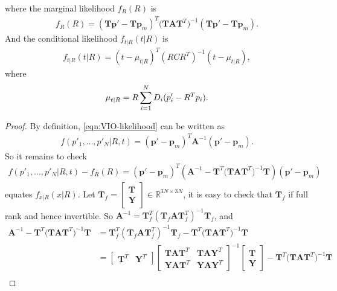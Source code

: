 \begin{theorem}
	where the marginal likelihood $f_R(R)$ is
	\begin{align} \label{eqn:VIO-likelihood-marginal}
		f_R(R) = (\mathbf{T}\bm{p}'-\mathbf{T}\bm{p}_m)^T \big(\mathbf{T}\mathbf{A}\mathbf{T}^T\big)^{-1} (\mathbf{T}\bm{p}'-\mathbf{T}\bm{p}_m).
	\end{align}
	And the conditional likelihood $f_{t|R}(t|R)$ is
	\begin{align} \label{eqn:VIO-likelihood-conditional}
		f_{t|R}(t|R) = (t - \mu_{t|R})^T (RCR^T)^{-1} (t - \mu_{t|R}),
	\end{align}
	where
	\begin{align} \label{eqn:VIO-likelihood-mu_{t|R}}
		\mu_{t|R} = R \sum_{i=1}^N D_i(p'_i-R^Tp_i).
	\end{align}
\end{theorem}
\begin{proof}
	By definition, \eqref{eqn:VIO-likelihood} can be written as
	\begin{align*}
		f(p'_1,\ldots,p'_N | R,t) = (\bm{p}'-\bm{p}_m)^T \mathbf{A}^{-1} (\bm{p}'-\bm{p}_m).
	\end{align*}
	So it remains to check
	\begin{align} \label{eqn:VIO-likelihood-conditional-proof}
		f(p'_1,\ldots,p'_N | R,t) - f_R(R) = (\bm{p}'-\bm{p}_m)^T \left( \mathbf{A}^{-1} - \mathbf{T}^T \big(\mathbf{T}\mathbf{A}\mathbf{T}^T\big)^{-1} \mathbf{T} \right) (\bm{p}'-\bm{p}_m)
	\end{align}
	equates $f_{x|R}(x|R)$.
	Let $\mathbf{T}_f = \begin{bmatrix} \mathbf{T} \\ \mathbf{Y} \end{bmatrix}\in\mathbb{R}^{3N\times 3N}$, it is easy to check that $\mathbf{T}_f$ if full rank and hence invertible.
	So $\mathbf{A}^{-1} = \mathbf{T}_f^T (\mathbf{T}_f\mathbf{A}\mathbf{T}_f^T)^{-1} \mathbf{T}_f$, and
	\begin{align*}
		\mathbf{A}^{-1} - \mathbf{T}^T \big(\mathbf{T}\mathbf{A}\mathbf{T}^T\big)^{-1} \mathbf{T} &= \mathbf{T}_f^T (\mathbf{T}_f\mathbf{A}\mathbf{T}_f^T)^{-1} \mathbf{T}_f - \mathbf{T}^T \big(\mathbf{T}\mathbf{A}\mathbf{T}^T\big)^{-1} \mathbf{T} \\
		&= \begin{bmatrix} \mathbf{T}^T & \mathbf{Y}^T \end{bmatrix} \begin{bmatrix} \mathbf{T}\mathbf{A}\mathbf{T}^T & \mathbf{T}\mathbf{A}\mathbf{Y}^T \\ \mathbf{Y}\mathbf{A}\mathbf{T}^T & \mathbf{Y}\mathbf{A}\mathbf{Y}^T\end{bmatrix}^{-1} \begin{bmatrix} \mathbf{T} \\ \mathbf{Y} \end{bmatrix} - \mathbf{T}^T \big(\mathbf{T}\mathbf{A}\mathbf{T}^T\big)^{-1} \mathbf{T} \\

\end{align*}
\end{proof}
